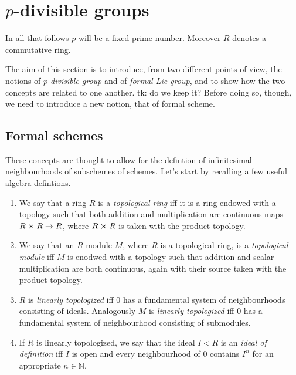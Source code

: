 \documentclass[../Main]{subfiles}
\begin{document}
\section{\texorpdfstring{$p$}{p}-divisible groups}
In all that follows $p$ will be a fixed prime number.
Moreover $R$ denotes a commutative ring.

The aim of this section is to introduce, from two different points of view,
the notions of {\em $p$-divisible group} and of {\em formal Lie group},
and to show how the two concepts are related to one another.
tk: do we keep it? Before doing so, though, we need to introduce a new notion, that
of formal scheme.


\subsection{Formal schemes}
These concepts are thought to allow for the defintion of
infinitesimal neighbourhoods of subschemes of schemes.
Let's start by recalling a few useful algebra defintions.

\begin{defn}\leavevmode\vspace{-1\baselineskip}
\begin{enumerate}
\item We say that a ring $R$ is a {\em topological ring} iff it is a ring endowed with a topology
	such that both addition and multiplication are continuous maps
	$R \cross R \to R$, where $R \cross R$ is taken with the product topology.

\item We say that an $R$-module $M$, where $R$ is a topological ring,
	is a {\em topological module} iff $M$ is enodwed with a topology such that
	addition and scalar multiplication are both continuous, again with their source
	taken with the product topology.

\item $R$ is {\em linearly topologized} iff $0$ has a fundamental system
	of neighbourhoods consisting of ideals.
	Analogously $M$ is {\em linearly topologized} iff $0$ has a fundamental
	system of neighbourhood consisting of submodules.

\item If $R$ is linearly topologized, we say that the ideal $I \triangleleft R$
	is an {\em ideal of definition} iff $I$ is open and every neighbourhood
	of $0$ contains $I^n$ for an appropriate $n \in \mathbb{N}$.
\end{enumerate}
\end{defn}
\end{document}
